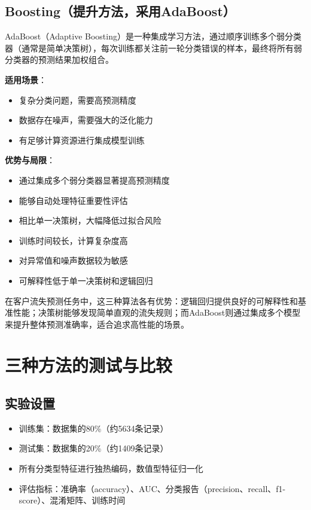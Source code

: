 \documentclass{article}
\begin{document}
\subsection{Boosting（提升方法，采用AdaBoost）}
AdaBoost（Adaptive Boosting）是一种集成学习方法，通过顺序训练多个弱分类器（通常是简单决策树），每次训练都关注前一轮分类错误的样本，最终将所有弱分类器的预测结果加权组合。

\textbf{适用场景}：
\begin{itemize}
    \item 复杂分类问题，需要高预测精度
    \item 数据存在噪声，需要强大的泛化能力
    \item 有足够计算资源进行集成模型训练
\end{itemize}

\textbf{优势与局限}：
\begin{itemize}
    \item 通过集成多个弱分类器显著提高预测精度
    \item 能够自动处理特征重要性评估
    \item 相比单一决策树，大幅降低过拟合风险
    \item 训练时间较长，计算复杂度高
    \item 对异常值和噪声数据较为敏感
    \item 可解释性低于单一决策树和逻辑回归
\end{itemize}

在客户流失预测任务中，这三种算法各有优势：逻辑回归提供良好的可解释性和基准性能；决策树能够发现简单直观的流失规则；而AdaBoost则通过集成多个模型来提升整体预测准确率，适合追求高性能的场景。

\section{三种方法的测试与比较}

\subsection{实验设置}
\begin{itemize}
    \item 训练集：数据集的80\%（约5634条记录）
    \item 测试集：数据集的20\%（约1409条记录）
    \item 所有分类型特征进行独热编码，数值型特征归一化
    \item 评估指标：准确率（accuracy）、AUC、分类报告（precision、recall、f1-score）、混淆矩阵、训练时间
\end{itemize}
\end{document}
